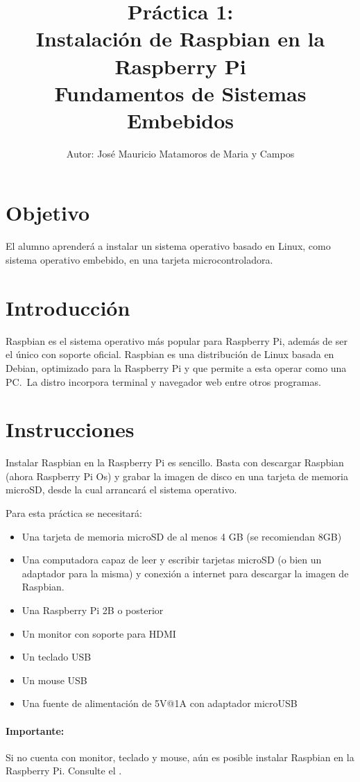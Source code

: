 \documentclass[letterpaper,10.5pt]{article}
\author{\footnotesize Autor: José Mauricio Matamoros de Maria y Campos}
\title{Práctica 1:\\Instalación de Raspbian en la Raspberry Pi\\
{\large Fundamentos de Sistemas Embebidos}}
\date{}
\begin{document}
\maketitle

\section{Objetivo}%
\label{sec:objective}
El alumno aprenderá a instalar un sistema operativo basado en Linux, como sistema operativo embebido, en una tarjeta microcontroladora.

\section{Introducción}%
\label{sec:introduction}
Raspbian es el sistema operativo más popular para Raspberry Pi, además de ser el único con soporte oficial.
Raspbian es una distribución de Linux basada en Debian, optimizado para la Raspberry Pi y que permite a esta operar como una PC.~La distro incorpora terminal y navegador web entre otros programas.

\section{Instrucciones}%
\label{sec:instructions}

Instalar Raspbian en la Raspberry Pi es sencillo.
Basta con descargar Raspbian (ahora Raspberry Pi Os) y grabar la imagen de disco en una tarjeta de memoria microSD, desde la cual arrancará el sistema operativo.

Para esta práctica se necesitará:
\begin{itemize}[nosep]
	\item Una tarjeta de memoria microSD de al menos 4 GB (se recomiendan 8GB)
	\item Una computadora capaz de leer y escribir tarjetas microSD (o bien un adaptador para la misma) y conexión a internet para descargar la imagen de Raspbian.
	\item Una Raspberry Pi 2B o posterior
	\item Un monitor con soporte para HDMI
	\item Un teclado USB
	\item Un mouse USB
	\item Una fuente de alimentación de 5V@1A con adaptador microUSB
\end{itemize}

\paragraph*{Importante:} Si no cuenta con monitor, teclado y mouse, aún es posible instalar Raspbian en la Raspberry Pi. Consulte el .
\end{document}
